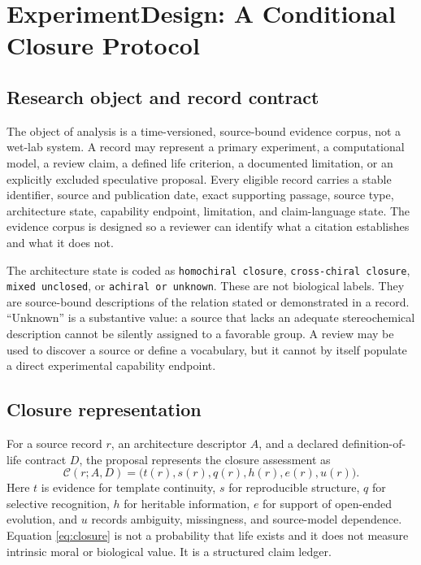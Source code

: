 \documentclass[conference]{IEEEtran}
\begin{document}
\section{ExperimentDesign: A Conditional Closure Protocol}

\subsection{Research object and record contract}

The object of analysis is a time-versioned, source-bound evidence corpus, not a wet-lab system. A record may represent a primary experiment, a computational model, a review claim, a defined life criterion, a documented limitation, or an explicitly excluded speculative proposal. Every eligible record carries a stable identifier, source and publication date, exact supporting passage, source type, architecture state, capability endpoint, limitation, and claim-language state. The evidence corpus is designed so a reviewer can identify what a citation establishes and what it does not.

The architecture state is coded as \texttt{homochiral closure}, \texttt{cross-chiral closure}, \texttt{mixed unclosed}, or \texttt{achiral or unknown}. These are not biological labels. They are source-bound descriptions of the relation stated or demonstrated in a record. ``Unknown'' is a substantive value: a source that lacks an adequate stereochemical description cannot be silently assigned to a favorable group. A review may be used to discover a source or define a vocabulary, but it cannot by itself populate a direct experimental capability endpoint.

\subsection{Closure representation}

For a source record $r$, an architecture descriptor $A$, and a declared definition-of-life contract $D$, the proposal represents the closure assessment as
\begin{equation}
\mathcal{C}(r;A,D)=\big(t(r),s(r),q(r),h(r),e(r),u(r)\big).
\label{eq:closure}
\end{equation}
Here $t$ is evidence for template continuity, $s$ for reproducible structure, $q$ for selective recognition, $h$ for heritable information, $e$ for support of open-ended evolution, and $u$ records ambiguity, missingness, and source-model dependence. Equation \eqref{eq:closure} is not a probability that life exists and it does not measure intrinsic moral or biological value. It is a structured claim ledger.
\end{document}
